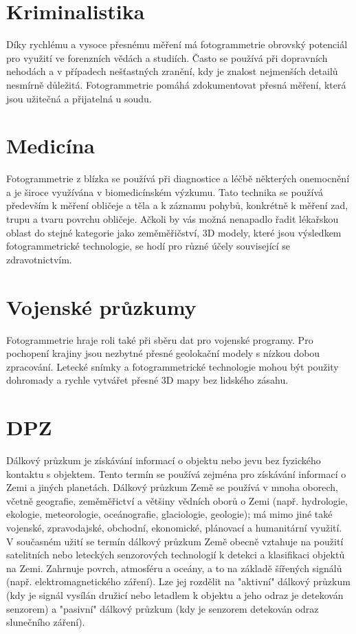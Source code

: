 \documentclass[12pt]{report}			%
\begin{document}
            \section{Kriminalistika}
            Díky rychlému a vysoce přesnému měření má fotogrammetrie obrovský potenciál pro využití ve forenzních vědách a studiích. Často se používá při dopravních nehodách a v případech nešťastných zranění, kdy je znalost nejmenších detailů nesmírně důležitá. Fotogrammetrie pomáhá zdokumentovat přesná měření, která jsou užitečná a přijatelná u soudu.
            \section{Medicína}
            Fotogrammetrie z blízka se používá při diagnostice a léčbě některých onemocnění a je široce využívána v biomedicínském výzkumu. Tato technika se používá především k měření obličeje a těla a k záznamu pohybů, konkrétně k měření zad, trupu a tvaru povrchu obličeje. Ačkoli by vás možná nenapadlo řadit lékařskou oblast do stejné kategorie jako zeměměřičství, 3D modely, které jsou výsledkem fotogrammetrické technologie, se hodí pro různé účely související se zdravotnictvím.
            \section{Vojenské průzkumy}
            Fotogrammetrie hraje roli také při sběru dat pro vojenské programy. Pro pochopení krajiny jsou nezbytné přesné geolokační modely s nízkou dobou zpracování. Letecké snímky a fotogrammetrické technologie mohou být použity dohromady a rychle vytvářet přesné 3D mapy bez lidského zásahu.
            \section{DPZ}
            Dálkový průzkum je získávání informací o objektu nebo jevu bez fyzického kontaktu s objektem. Tento termín se používá zejména pro získávání informací o Zemi a jiných planetách. Dálkový průzkum Země se používá v mnoha oborech, včetně geografie, zeměměřictví a většiny vědních oborů o Zemi (např. hydrologie, ekologie, meteorologie, oceánografie, glaciologie, geologie); má mimo jiné také vojenské, zpravodajské, obchodní, ekonomické, plánovací a humanitární využití.
            \\V současném užití se termín dálkový průzkum Země obecně vztahuje na použití satelitních nebo leteckých senzorových technologií k detekci a klasifikaci objektů na Zemi. Zahrnuje povrch, atmosféru a oceány, a to na základě šířených signálů (např. elektromagnetického záření). Lze jej rozdělit na "aktivní" dálkový průzkum (kdy je signál vysílán družicí nebo letadlem k objektu a jeho odraz je detekován senzorem) a "pasivní" dálkový průzkum (kdy je senzorem detekován odraz slunečního záření).
\end{document}
